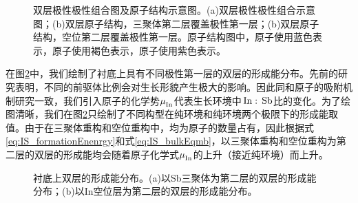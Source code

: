 \begin{figure}[!htb]
\begin{minipage}[b]{0.5\textwidth}
{        }
    \end{minipage}
    \caption{双层极性极性组合图及原子结构示意图。(a)双层极性极性组合示意图；(b)双层原子结构，三聚体第二层覆盖极性第一层；(b)双层原子结构，空位第二层覆盖极性第一层。原子结构图中，原子使用蓝色表示，原子使用褐色表示，原子使用紫色表示。}
    \label{fig:IS_structure_2Linsb}
\end{figure}

在图\ref{fig:IS_DFT_2LInSb_formationEnergy}中，我们绘制了衬底上具有不同极性第一层的双层的形成能分布。先前的研究表明，不同的前驱体比例会对生长形貌产生极大的影响。因此同和原子的吸附机制研究一致，我们引入原子的化学势$\it \mu_{\rm In}^{\rm } \it$代表生长环境中$\cemb{In}:\cemb{Sb}$比的变化。为了绘图清晰，我们在图\ref{fig:IS_DFT_2LInSb_formationEnergy}只绘制了不同构型在纯环境和纯环境两个极限下的形成能取值。由于在三聚体重构和空位重构中，均为原子的数量占有，因此根据式\ref{eq:IS_formationEnenrgy}和式\ref{eq:IS_bulkEqmb}，以三聚体重构和空位重构为第二层的双层的形成能均会随着原子化学式$\it \mu_{\rm In}^{\rm } \it$的上升（接近纯环境）而上升。

\begin{figure}[!htb]
    \caption{衬底上双层的形成能分布。(a)以Sb三聚体为第二层的双层的形成能分布；(b)以In空位层为第二层的双层的形成能分布。}
    \label{fig:IS_DFT_2LInSb_formationEnergy}
\end{figure}

